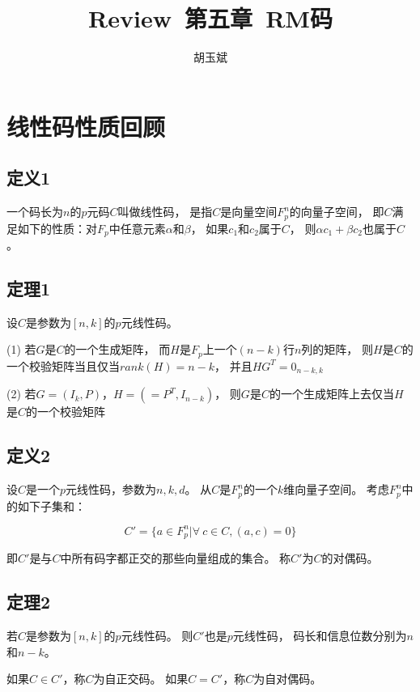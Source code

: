 \documentclass[onecolumn,oneside]{BUPTHomework}
\author{胡玉斌}
\title{Review\ 第五章\ RM码}
\begin{document}
  \maketitle
  
  \section*{线性码性质回顾}

  \subsection*{定义1}

  一个码长为$n$的$p$元码$C$叫做线性码，
  是指$C$是向量空间$F^n_p$的向量子空间，
  即$C$满足如下的性质：对$F_p$中任意元素$\alpha$和$\beta$，
  如果$c_1$和$c_2$属于$C$，
  则$\alpha c_1+\beta c_2$也属于$C$。

  \subsection*{定理1}

  设$C$是参数为$[n,k]$的$p$元线性码。

  (1) 若$G$是$C$的一个生成矩阵，
  而$H$是$F_p$上一个$(n-k)$行$n$列的矩阵，
  则$H$是$C$的一个校验矩阵当且仅当$rank(H)=n-k$，
  并且$HG^T=0_{n-k,k}$

  (2) 若$G=(I_k,P)$，$H=(=P^T,I_{n-k})$，
  则$G$是$C$的一个生成矩阵上去仅当$H$是$C$的一个校验矩阵

  \subsection*{定义2}

  设$C$是一个$p$元线性码，参数为$n,k,d$。
  从$C$是$F^n_p$的一个$k$维向量子空间。
  考虑$F^n_p$中的如下子集和：

  $$C'=\{a\in F^n_p \vert \forall\ c \in C, (a,c)=0 \}$$

  即$C'$是与$C$中所有码字都正交的那些向量组成的集合。
  称$C'$为$C$的对偶码。

  \subsection*{定理2}

  若$C$是参数为$[n,k]$的$p$元线性码。
  则$C'$也是$p$元线性码，
  码长和信息位数分别为$n$和$n-k$。

  如果$C \in C'$，称$C$为自正交码。
  如果$C = C'$，称$C$为自对偶码。
\end{document}
